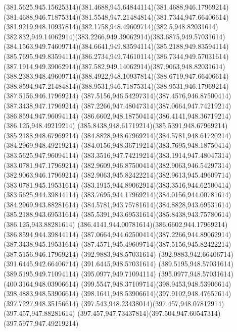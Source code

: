{{	\curveto(381.5625,945.15625314)(381.4688,945.64844114)(381.4688,946.17969214)
	\curveto(381.4688,946.71875314)(381.5548,947.21484814)(381.7344,947.66406614)
	\curveto(381.9219,948.10937814)(382.1758,948.49609714)(382.5,948.82031614)
	\curveto(382.832,949.14062914)(383.2266,949.39062914)(383.6875,949.57031614)
	\curveto(384.1563,949.74609714)(384.6641,949.83594114)(385.2188,949.83594114)
	\curveto(385.7695,949.83594114)(386.2734,949.74610114)(386.7344,949.57031614)
	\curveto(387.1914,949.39062914)(387.582,949.14062914)(387.9063,948.82031614)
	\curveto(388.2383,948.49609714)(388.4922,948.10937814)(388.6719,947.66406614)
	\curveto(388.8594,947.21484814)(388.9531,946.71875314)(388.9531,946.17969214)
	\closepath
	\moveto(387.5156,946.17969214)
	\curveto(387.5156,946.54297314)(387.4576,946.87500414)(387.3438,947.17969214)
	\curveto(387.2266,947.48047314)(387.0664,947.74219214)(386.8594,947.96094114)
	\curveto(386.6602,948.18750414)(386.4141,948.36719214)(386.125,948.49219214)
	\curveto(385.8438,948.61719214)(385.5391,948.67969214)(385.2188,948.67969214)
	\curveto(384.8828,948.67969214)(384.5781,948.61720214)(384.2969,948.49219214)
	\curveto(384.0156,948.36719214)(383.7695,948.18750414)(383.5625,947.96094114)
	\curveto(383.3516,947.74219214)(383.1914,947.48047314)(383.0781,947.17969214)
	\curveto(382.9609,946.87500414)(382.9063,946.54297314)(382.9063,946.17969214)
	\curveto(382.9063,945.82422214)(382.9613,945.49609714)(383.0781,945.19531614)
	\curveto(383.1915,944.89062914)(383.3516,944.62500414)(383.5625,944.39844114)
	\curveto(383.7695,944.17969214)(384.0156,944.00781614)(384.2969,943.88281614)
	\curveto(384.5781,943.75781614)(384.8828,943.69531614)(385.2188,943.69531614)
	\curveto(385.5391,943.69531614)(385.8438,943.75780614)(386.125,943.88281614)
	\curveto(386.4141,944.00781614)(386.6602,944.17969214)(386.8594,944.39844114)
	\curveto(387.0664,944.62500414)(387.2266,944.89062914)(387.3438,945.19531614)
	\curveto(387.4571,945.49609714)(387.5156,945.82422214)(387.5156,946.17969214)
	\closepath
	\moveto(392.9883,948.57031614)
	\lineto(392.9883,942.66406714)
	\lineto(391.6445,942.66406714)
	\lineto(391.6445,948.57031614)
	\lineto(389.5195,948.57031614)
	\lineto(389.5195,949.71094114)
	\lineto(395.0977,949.71094114)
	\lineto(395.0977,948.57031614)
	\closepath
	\moveto(400.3164,948.03906614)
	\curveto(399.5547,948.37109714)(398.9453,948.53906614)(398.4883,948.53906614)
	\curveto(398.1641,948.53906614)(397.9102,948.47657614)(397.7227,948.35156614)
	\curveto(397.543,948.23438014)(397.457,948.07812914)(397.457,947.88281614)
	\curveto(397.457,947.73437814)(397.504,947.60547314)(397.5977,947.49219214)
}}
